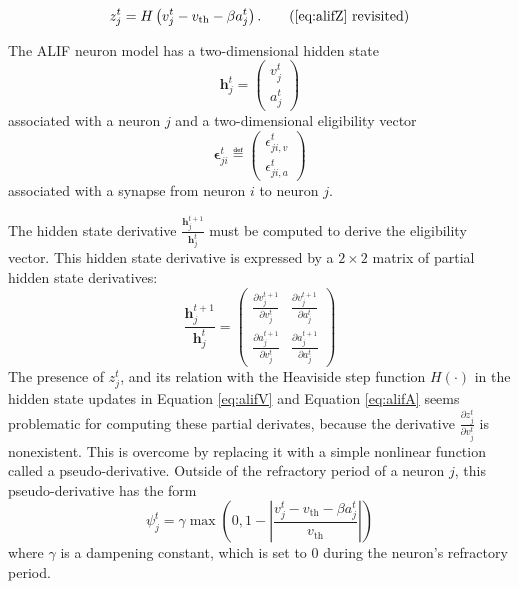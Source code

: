         \begin{equation*}
        z^t_j = H\left(v_j^t - v_\text{th} - \beta a^t_j\right). \tag{\ref{eq:alifZ} revisited}
        \end{equation*}

        The ALIF neuron model has a two-dimensional hidden state
        \begin{equation}
        \mathbf{h}^t_j = \begin{pmatrix}
        v^t_j\\
        a^t_j
        \end{pmatrix}
        \end{equation}
        associated with a neuron $j$ and a two-dimensional eligibility vector
        \begin{equation}
        \mathbf{\epsilon}^t_{ji} \eqdef \begin{pmatrix}
        \epsilon_{ji, v}^t\\
        \epsilon_{ji, a}^t
        \end{pmatrix}
        \end{equation}
        associated with a synapse from neuron $i$ to neuron $j$.

        The hidden state derivative $\frac{\mathbf{h}^{t+1}_j}{\mathbf{h}^t_j}$ must be computed to derive the eligibility vector.
        This hidden state derivative is expressed by a $2\times2$ matrix of partial hidden state derivatives:
        \begin{equation}
        \frac{\mathbf{h}^{t+1}_j}{\mathbf{h}^t_j} = \begin{pmatrix}
        \frac{\partial v^{t+1}_j}{\partial v^t_j} & \frac{\partial v^{t+1}_j}{\partial a^t_j}\\
        \frac{\partial a^{t+1}_j}{\partial v^t_j} & \frac{\partial a^{t+1}_j}{\partial a^t_j}
        \end{pmatrix}
        \end{equation}
        The presence of $z^t_j$, and its relation with the Heaviside step function $H(\cdot)$ in the hidden state updates in Equation \ref{eq:alifV} and Equation \ref{eq:alifA} seems problematic for computing these partial derivates, because the derivative $\frac{\partial z^t_j}{\partial v^t_j}$ is nonexistent.
        This is overcome by replacing it with a simple nonlinear function called a pseudo-derivative.
        Outside of the refractory period of a neuron $j$, this pseudo-derivative has the form
        \begin{equation}
        \psi_j^t = \gamma \max\left(0, 1 - \left|\frac{v_j^t - v_\text{th} - \beta a^t_j}{v_\text{th}}\right|\right)
        \end{equation}
        where $\gamma$ is a dampening constant, which is set to 0 during the neuron's refractory period.

